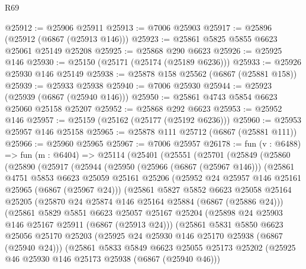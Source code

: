 \begin{lexlean}{R69}
\begin{coremodule}
{@25912 := @25906 @25911
@25913 := @7006 @25903
@25917 := @25896 (@25912 (@6867 (@25913 @146)))
@25923 := @25861 @5825 @5855 @6623 @25061 @25149 @25208
@25925 := @25868 @290 @6623
@25926 := @25925 @146
@25930 := @25150 (@25171 (@25174 (@25189 @6236)))
@25933 := @25926 @25930 @146 @25149
@25938 := @25878 @158 @25562 (@6867 (@25881 @158))
@25939 := @25933 @25938
@25940 := @7006 @25930
@25944 := @25923 (@25939 (@6867 (@25940 @146)))
@25950 := @25861 @4743 @5854 @6623 @25060 @25158 @25207
@25952 := @25868 @292 @6623
@25953 := @25952 @146
@25957 := @25159 (@25162 (@25177 (@25192 @6236)))
@25960 := @25953 @25957 @146 @25158
@25965 := @25878 @111 @25712 (@6867 (@25881 @111))
@25966 := @25960 @25965
@25967 := @7006 @25957
@26178 := fun (v : @6488) =>
  fun (m : @6404) =>
  @25114
    (@25401
      (@25551
        (@25701
          (@25849
            (@25860
              (@25890
                (@25917
                  (@25944
                    (@25950
                      (@25966 (@6867 (@25967 @146)))
                      (@25861
                        @4751
                        @5853
                        @6623
                        @25059
                        @25161
                        @25206
                        (@25952 @24 @25957 @146 @25161 @25965 (@6867 (@25967 @24)))
                        (@25861
                          @5827
                          @5852
                          @6623
                          @25058
                          @25164
                          @25205
                          (@25870 @24 @25874 @146 @25164 @25884 (@6867 (@25886 @24)))
                          (@25861
                            @5829
                            @5851
                            @6623
                            @25057
                            @25167
                            @25204
                            (@25898 @24 @25903 @146 @25167 @25911 (@6867 (@25913 @24)))
                            (@25861
                              @5831
                              @5850
                              @6623
                              @25056
                              @25170
                              @25203
                              (@25925 @24 @25930 @146 @25170 @25938 (@6867 (@25940 @24)))
                              (@25861
                                @5833
                                @5849
                                @6623
                                @25055
                                @25173
                                @25202
                                (@25925 @46 @25930 @146 @25173 @25938 (@6867 (@25940 @46)))
}
\end{coremodule}
\end{lexlean}
